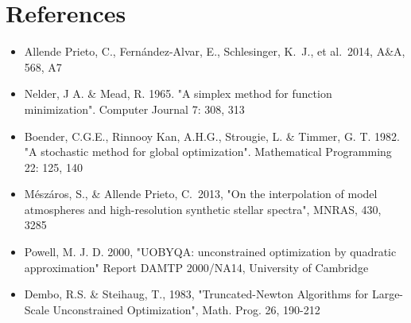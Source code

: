 \documentclass[12pt]{article}
\begin{document}
\section{References}

\begin{itemize}
\item Allende Prieto, C., Fern{\'a}ndez-Alvar, E., Schlesinger, K.~J., et al.\ 2014, A\&A, 568, A7 
\item Nelder, J A. \&  Mead, R. 1965. "A simplex method for function minimization". 
Computer Journal 7: 308, 313
\item  Boender, C.G.E., Rinnooy Kan, A.H.G., Strougie, L. \& Timmer, G. T. 1982. 
"A stochastic method for global optimization". Mathematical Programming 22: 125, 140
\item M{\'e}sz{\'a}ros, S., \& Allende Prieto, C.\ 2013, "On the interpolation of 
model atmospheres and high-resolution synthetic stellar spectra", MNRAS, 430, 3285 
\item Powell, M. J. D. 2000, "UOBYQA: unconstrained optimization by
quadratic approximation"  Report DAMTP 2000/NA14, University of Cambridge
\item Dembo, R.S. \& Steihaug, T., 1983, "Truncated-Newton Algorithms for 
Large-Scale Unconstrained Optimization", Math. Prog. 26, 190-212 
\end{itemize}
\end{document}
